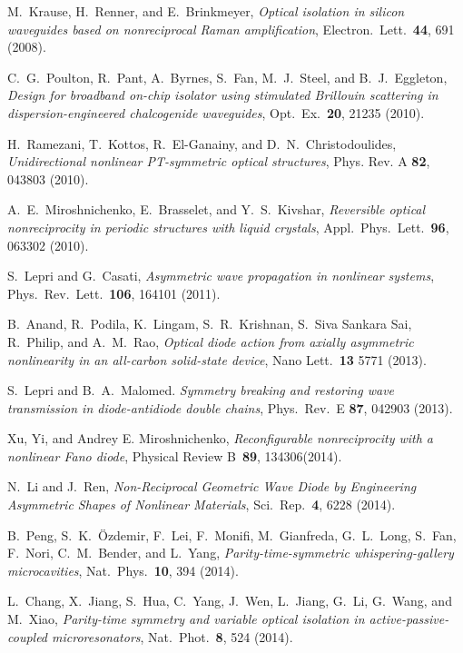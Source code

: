 \documentclass[aps,prx,twocolumn,superscriptaddress]{revtex4-1}
\begin{document}
\begin{thebibliography}{99}
 M.~Krause, H.~Renner, and E.~Brinkmeyer,
  \textit{Optical isolation in silicon waveguides based on nonreciprocal Raman amplification},
  Electron.~Lett.~\textbf{44}, 691 (2008).

 C.~G.~Poulton, R.~Pant, A.~Byrnes, S.~Fan, M.~J.~Steel,
  and B.~J.~Eggleton,
  \textit{Design for broadband on-chip isolator using stimulated Brillouin scattering in dispersion-engineered chalcogenide waveguides},
  Opt.~Ex.~\textbf{20}, 21235 (2010).

  H.~Ramezani, T.~Kottos, R.~El-Ganainy, and D.~N.~Christodoulides, {\it Unidirectional nonlinear PT-symmetric optical structures}, Phys. Rev. A {\bf 82}, 043803 (2010).

 A.~E.~Miroshnichenko, E.~Brasselet, and Y.~S.~Kivshar,
  \textit{Reversible optical nonreciprocity in periodic structures with liquid crystals},
  Appl.~Phys.~Lett.~\textbf{96}, 063302 (2010).

  S.~Lepri and G.~Casati, \textit{Asymmetric wave propagation in nonlinear systems},
  Phys.~Rev.~Lett.~\textbf{106}, 164101 (2011).

 B.~Anand, R.~Podila, K.~Lingam, S.~R.~Krishnan, S.~Siva Sankara Sai, R.~Philip, and A.~M.~Rao, \textit{Optical diode action from axially asymmetric nonlinearity in an all-carbon solid-state device}, Nano Lett.~\textbf{13} 5771 (2013).

  S.~Lepri and B.~A.~Malomed. \textit{Symmetry breaking and restoring wave transmission in diode-antidiode double chains}, Phys.~Rev.~E \textbf{87}, 042903 (2013).

  Xu, Yi, and Andrey E. Miroshnichenko, \textit{Reconfigurable nonreciprocity with a nonlinear Fano diode}, Physical Review B~\textbf{89}, 134306(2014).

  N.~Li and J.~Ren, \textit{Non-Reciprocal Geometric Wave Diode by Engineering Asymmetric Shapes of Nonlinear Materials}, Sci.~Rep.~\textbf{4}, 6228 (2014).

 B.~Peng, S.~K.~{\"O}zdemir, F.~Lei, F.~Monifi,
  M.~Gianfreda, G.~L.~Long, S.~Fan, F.~Nori, C.~M.~Bender, and
  L.~Yang,
  \textit{Parity-time-symmetric whispering-gallery microcavities},
  Nat.~Phys.~\textbf{10}, 394 (2014).

 L.~Chang, X.~Jiang, S.~Hua, C.~Yang, J.~Wen,
  L.~Jiang, G.~Li, G.~Wang, and M.~Xiao,
  \textit{Parity-time symmetry and variable optical isolation in active-passive-coupled microresonators},
  Nat.~Phot.~\textbf{8}, 524 (2014).


\end{thebibliography}
\end{document}
